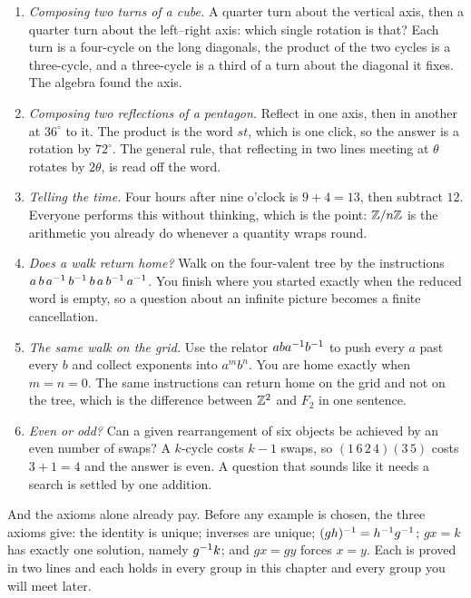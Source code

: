 \begin{enumerate}[leftmargin=1.5em,itemsep=3pt]
\item \emph{Composing two turns of a cube.} A quarter turn about the vertical axis, then a quarter turn about the left--right axis: which single rotation is that? Each turn is a four-cycle on the long diagonals, the product of the two cycles is a three-cycle, and a three-cycle is a third of a turn about the diagonal it fixes. The algebra found the axis.
\item \emph{Composing two reflections of a pentagon.} Reflect in one axis, then in another at $36^\circ$ to it. The product is the word $st$, which is one click, so the answer is a rotation by $72^\circ$. The general rule, that reflecting in two lines meeting at $\theta$ rotates by $2\theta$, is read off the word.
\item \emph{Telling the time.} Four hours after nine o'clock is $9+4=13$, then subtract $12$. Everyone performs this without thinking, which is the point: $\mathbb{Z}/n\mathbb{Z}$ is the arithmetic you already do whenever a quantity wraps round.
\item \emph{Does a walk return home?} Walk on the four-valent tree by the instructions $a\,b\,a^{-1}\,b^{-1}\,b\,a\,b^{-1}\,a^{-1}$. You finish where you started exactly when the reduced word is empty, so a question about an infinite picture becomes a finite cancellation.
\item \emph{The same walk on the grid.} Use the relator $aba^{-1} b^{-1}$ to push every $a$ past every $b$ and collect exponents into $a^mb^n$. You are home exactly when $m=n=0$. The same instructions can return home on the grid and not on the tree, which is the difference between $\mathbb{Z}^2$ and $F_2$ in one sentence.
\item \emph{Even or odd?} Can a given rearrangement of six objects be achieved by an even number of swaps? A $k$-cycle costs $k-1$ swaps, so $(1\,6\,2\,4)(3\,5)$ costs $3+1=4$ and the answer is even. A question that sounds like it needs a search is settled by one addition.
\end{enumerate}

\begin{bigpic}
And the axioms alone already pay. Before any example is chosen, the three axioms give: the identity is unique; inverses are unique; $(gh)^{-1}=h^{-1} g^{-1}$; $gx=k$ has exactly one solution, namely $g^{-1} k$; and $gx=gy$ forces $x=y$. Each is proved in two lines and each holds in every group in this chapter and every group you will meet later.
\end{bigpic}

